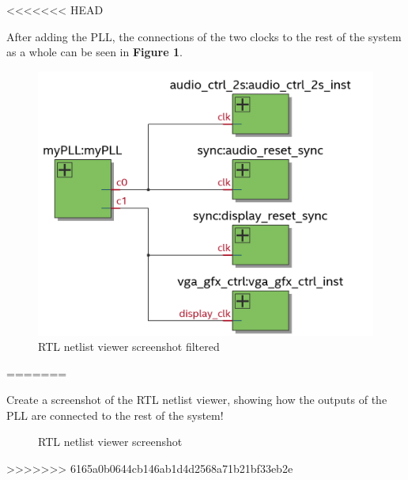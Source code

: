 \documentclass[10pt,a4paper,titlepage,oneside]{article}
\begin{document}
\maketitle



<<<<<<< HEAD
\begin{qa}{After adding the PLL, the connections of the two clocks to the rest of the system as a whole can be seen in \textbf{Figure 1}.}
	\begin{center}
		\begin{figure}[h!]
			\centering
				\includegraphics[width=0.5\linewidth]{pll.png}
			\caption{RTL netlist viewer screenshot filtered}
		\end{figure}
	\end{center}
=======
\begin{qa}{Create a screenshot of the RTL netlist viewer, showing how the outputs of the PLL are connected to the rest of the system!}
	\begin{figure}[h!]
		\centering
		\dummyimage
		\caption{RTL netlist viewer screenshot}
	\end{figure}
>>>>>>> 6165a0b0644cb146ab1d4d2568a71b21bf33eb2e
\end{qa}




\end{qa}
\end{document}
